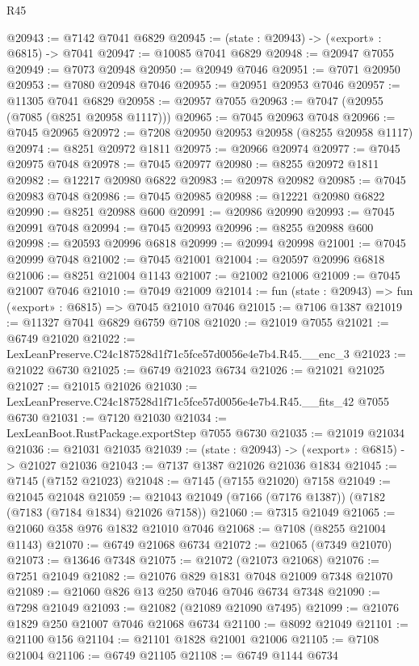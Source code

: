 \begin{lexlean}{R45}
\begin{coremodule}
{@20943 := @7142 @7041 @6829
@20945 := (state : @20943) -> («export» : @6815) -> @7041
@20947 := @10085 @7041 @6829
@20948 := @20947 @7055
@20949 := @7073 @20948
@20950 := @20949 @7046
@20951 := @7071 @20950
@20953 := @7080 @20948 @7046
@20955 := @20951 @20953 @7046
@20957 := @11305 @7041 @6829
@20958 := @20957 @7055
@20963 := @7047 (@20955 (@7085 (@8251 @20958 @1117)))
@20965 := @7045 @20963 @7048
@20966 := @7045 @20965
@20972 := @7208 @20950 @20953 @20958 (@8255 @20958 @1117)
@20974 := @8251 @20972 @1811
@20975 := @20966 @20974
@20977 := @7045 @20975 @7048
@20978 := @7045 @20977
@20980 := @8255 @20972 @1811
@20982 := @12217 @20980 @6822
@20983 := @20978 @20982
@20985 := @7045 @20983 @7048
@20986 := @7045 @20985
@20988 := @12221 @20980 @6822
@20990 := @8251 @20988 @600
@20991 := @20986 @20990
@20993 := @7045 @20991 @7048
@20994 := @7045 @20993
@20996 := @8255 @20988 @600
@20998 := @20593 @20996 @6818
@20999 := @20994 @20998
@21001 := @7045 @20999 @7048
@21002 := @7045 @21001
@21004 := @20597 @20996 @6818
@21006 := @8251 @21004 @1143
@21007 := @21002 @21006
@21009 := @7045 @21007 @7046
@21010 := @7049 @21009
@21014 := fun (state : @20943) => fun («export» : @6815) => @7045 @21010 @7046
@21015 := @7106 @1387
@21019 := @11327 @7041 @6829 @6759 @7108
@21020 := @21019 @7055
@21021 := @6749 @21020
@21022 := LexLeanPreserve.C24c187528d1f71c5fce57d0056e4e7b4.R45.__enc_3
@21023 := @21022 @6730
@21025 := @6749 @21023 @6734
@21026 := @21021 @21025
@21027 := @21015 @21026
@21030 := LexLeanPreserve.C24c187528d1f71c5fce57d0056e4e7b4.R45.__fits_42 @7055 @6730
@21031 := @7120 @21030
@21034 := LexLeanBoot.RustPackage.exportStep @7055 @6730
@21035 := @21019 @21034
@21036 := @21031 @21035
@21039 := (state : @20943) -> («export» : @6815) -> @21027 @21036
@21043 := @7137 @1387 @21026 @21036 @1834
@21045 := @7145 (@7152 @21023)
@21048 := @7145 (@7155 @21020) @7158
@21049 := @21045 @21048
@21059 := @21043 @21049 (@7166 (@7176 @1387)) (@7182 (@7183 (@7184 @1834) @21026 @7158))
@21060 := @7315 @21049
@21065 := @21060 @358 @976 @1832 @21010 @7046
@21068 := @7108 (@8255 @21004 @1143)
@21070 := @6749 @21068 @6734
@21072 := @21065 (@7349 @21070)
@21073 := @13646 @7348
@21075 := @21072 (@21073 @21068)
@21076 := @7251 @21049
@21082 := @21076 @829 @1831 @7048 @21009 @7348 @21070
@21089 := @21060 @826 @13 @250 @7046 @7046 @6734 @7348
@21090 := @7298 @21049
@21093 := @21082 (@21089 @21090 @7495)
@21099 := @21076 @1829 @250 @21007 @7046 @21068 @6734
@21100 := @8092 @21049
@21101 := @21100 @156
@21104 := @21101 @1828 @21001 @21006
@21105 := @7108 @21004
@21106 := @6749 @21105
@21108 := @6749 @1144 @6734
}
\end{coremodule}
\end{lexlean}
